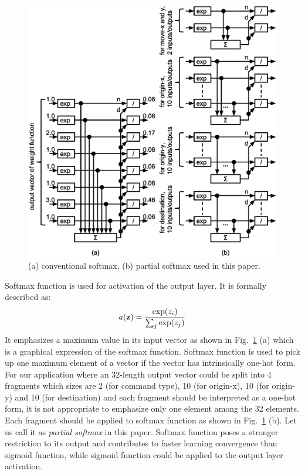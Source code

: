 \documentclass[twocolumn]{article}
\begin{document}
\begin{figure}[!tp]
 \begin{center}
  \begin{minipage}{\hsize}
   \includegraphics[width=\hsize]{fig/partial_softmax_06.eps}
   \caption{(a) conventional softmax, (b) partial softmax used in this paper.}
   \label{fig:partial_softmax}
  \end{minipage}
 \end{center}
\end{figure}

Softmax function is used for activation of the output layer.
It is formally described as:
\begin{eqnarray}
a({\bf z}) = \frac{\exp(z_i)}{\sum_j \exp(z_j)}
\end{eqnarray}
It emphasizes a maximum value in its input vector
as shown in Fig.\ \ref{fig:partial_softmax} (a)
which is a graphical expression of the softmax function.
Softmax function is used to pick up one maximum element of a vector
if the vector has intrinsically one-hot form.
For our application where an 32-length output vector could be split
into 4 fragments which sizes are
2 (for command type), 10 (for origin-x), 10 (for origin-y)
and 10 (for destination)
and each fragment should be interpreted as a one-hot form,
it is not appropriate to emphasize only one element among the 32 elements.
Each fragment should be applied to softmax function
as shown in Fig.\ \ref{fig:partial_softmax} (b).
Let us call it as {\it partial softmax} in this paper.
Softmax function poses a stronger restriction to its output
and contributes to faster learning convergence than sigmoid function,
while sigmoid function could be applied to the output layer activation.
\end{document}
